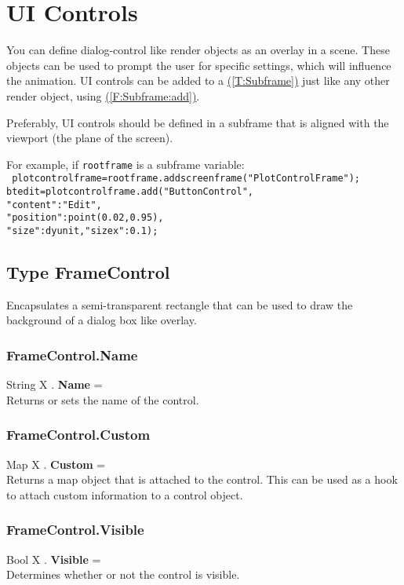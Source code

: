 \documentclass[10pt]{book}
\newcommand{\linkitem}[1]{\hyperref[#1]{\nameref{#1} (\ref{#1})}}
\newcommand{\sourcecode}[1]{\texttt{#1}}
\begin{document}
\section{UI Controls \label{UI Controls}}
You can define dialog-control like render objects as an overlay in a scene. These objects can be used to prompt the user for specific settings, which will influence the animation. UI controls can be added to a \linkitem{T:Subframe} just like any other render object, using \linkitem{F:Subframe:add}.

Preferably, UI controls should be defined in a subframe that is aligned with the viewport (the plane of the screen).

For example, if \sourcecode{rootframe} is a subframe variable: \\
\sourcecode{
plotcontrolframe=rootframe.addscreenframe("PlotControlFrame"); \\
btedit=plotcontrolframe.add("ButtonControl", \\
   "content":"Edit", \\
   "position":point(0.02,0.95), \\
   "size":dyunit,"sizex":0.1); \\
}

\subsection{Type FrameControl \label{T:FrameControl}}
Encapsulates a semi-transparent rectangle that can be used to draw the background of a dialog box like overlay.

\subsubsection{FrameControl.Name \label{F:FrameControl:Name}}
String X . \textbf{Name} = \\
Returns or sets the name of the control.

\subsubsection{FrameControl.Custom \label{F:FrameControl:Custom}}
Map X . \textbf{Custom} = \\
Returns a map object that is attached to the control. This can be used as a hook to attach custom information to a control object.

\subsubsection{FrameControl.Visible \label{F:FrameControl:Visible}}
Bool X . \textbf{Visible} = \\
Determines whether or not the control is visible.
\end{document}
